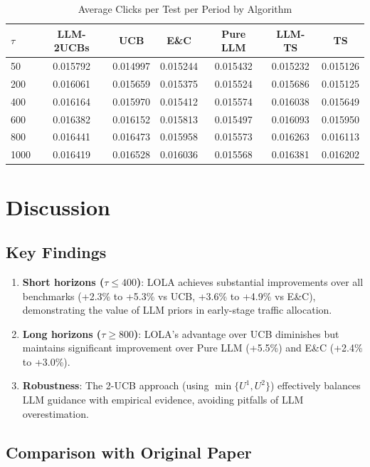 \documentclass[11pt,a4paper]{article}
\begin{document}
\begin{table}[H]
\centering
\caption{Average Clicks per Test per Period by Algorithm}
\begin{tabular}{lcccccc}
\toprule
$\tau$ & LLM-2UCBs & UCB & E\&C & Pure LLM & LLM-TS & TS \\
\midrule
50 & 0.015792 & 0.014997 & 0.015244 & 0.015432 & 0.015232 & 0.015126 \\
200 & 0.016061 & 0.015659 & 0.015375 & 0.015524 & 0.015686 & 0.015125 \\
400 & 0.016164 & 0.015970 & 0.015412 & 0.015574 & 0.016038 & 0.015649 \\
600 & 0.016382 & 0.016152 & 0.015813 & 0.015497 & 0.016093 & 0.015950 \\
800 & 0.016441 & 0.016473 & 0.015958 & 0.015573 & 0.016263 & 0.016113 \\
1000 & 0.016419 & 0.016528 & 0.016036 & 0.015568 & 0.016381 & 0.016202 \\
\bottomrule
\end{tabular}
\end{table}

\section{Discussion}

\subsection{Key Findings}

\begin{enumerate}
    \item \textbf{Short horizons ($\tau \leq 400$)}: LOLA achieves substantial improvements over all benchmarks (+2.3\% to +5.3\% vs UCB, +3.6\% to +4.9\% vs E\&C), demonstrating the value of LLM priors in early-stage traffic allocation.
    
    \item \textbf{Long horizons ($\tau \geq 800$)}: LOLA's advantage over UCB diminishes but maintains significant improvement over Pure LLM (+5.5\%) and E\&C (+2.4\% to +3.0\%).
    
    \item \textbf{Robustness}: The 2-UCB approach (using $\min\{U^1, U^2\}$) effectively balances LLM guidance with empirical evidence, avoiding pitfalls of LLM overestimation.
\end{enumerate}

\subsection{Comparison with Original Paper}
\end{document}
